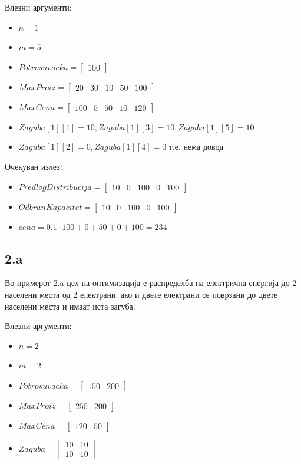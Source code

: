 \documentclass{article}
\begin{document}
Влезни аргументи: 
\begin{itemize}
\item $n = 1$
\item $m = 5$
\item $Potrosuvacka = \begin{bmatrix} 100 \end{bmatrix}$
\item $MaxProiz = \begin{bmatrix} 20 & 30 & 10 & 50 & 100 \end{bmatrix}$
\item $MaxCena = \begin{bmatrix} 100 & 5 & 50 & 10 & 120 \end{bmatrix}$
\item $Zaguba[1][1] = 10, Zaguba[1][3] = 10, Zaguba[1][5] = 10$
\item $Zaguba[1][2] = 0, Zaguba[1][4] = 0$ т.е. нема довод
\end{itemize}

Очекуван излез:
\begin{itemize}
\item $PredlogDistribucija = \begin{bmatrix}  10 & 0 & 100 & 0 & 100 \end{bmatrix}$
\item $OdbranKapacitet = \begin{bmatrix} 10 & 0 & 100 & 0 & 100\end{bmatrix}$
\item $cena = 0.1 \cdot 100 + 0 + 50 + 0 + 100 = 234 $
\end{itemize}

\subsection{2.a}
Во примерот 2.a цел на оптимизација е распределба на електрична енергија до 2 населени места од 2 електрани, ако и двете електрани се поврзани до двете населени места и имаат иста загуба. 

Влезни аргументи:
\begin{itemize}
\item $n = 2$
\item $m = 2$
\item $Potrosuvacka = \begin{bmatrix} 150 & 200\end{bmatrix}$
\item $MaxProiz = \begin{bmatrix} 250 & 200 \end{bmatrix}$
\item $MaxCena = \begin{bmatrix} 120 & 50 \end{bmatrix}$
\item $Zaguba = \begin{bmatrix} 10 & 10\\ 10 & 10 \end{bmatrix}$
\end{itemize}
\end{document}
